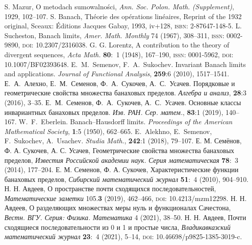 \documentclass[a4paper,14pt]{article}
\begin{document}
	\small
	\begin{thebibliography}{99}
		{}
		S. Mazur, O metodach sumowalno\'sci,
		\emph{Ann. Soc. Polon. Math. (Supplement)}, 1929, 102--107.
		{}
		S. Banach, Th\'eorie des op\'erations lin\'eaires, Reprint of the 1932 original, Sceaux: \'Editions Jacques Gabay,
		1993, iv+128, \textsc{isbn}: 2-87647-148-5.
		{}
		L. Sucheston, Banach limits, \emph{Amer. Math. Monthly} 74 (1967), 308--311, \textsc{issn}: 0002-9890,
		\textsc{doi}: {10.2307/2316038}.
		{}
		G. G. Lorentz, A contribution to the theory of divergent sequences, \emph{Acta Math.} \textbf{80}:~{1}
		(1948), 167--190, \textsc{issn}: 0001-5962, \textsc{doi}: {10.1007/BF02393648}.
		{}
		E.~M.~Semenov, F.~A.~Sukochev. Invariant Banach limits
		and applications. {\it Journal of Functional Analysis}, {\bf 259}:6 (2010), 1517--1541.
		{}
		Е.~А.~Алехно, Е.~М.~Семенов, Ф.~А.~Сукочев, А.~С.~Усачев. Порядковые и геометрические
		свойства множества банаховых пределов. {\it Алгебра и анализ}, {\bf 28}:3 (2016), 3--35.
		{}
		Е.~М.~Семенов, Ф.~А.~Сукочев, А.~С.~Усачев. Основные классы
		инвариантных банаховых пределов. {\it Изв. РАН. Сер. матем.}, {\bf 83}:1 (2019), 140--167.
		{}
		W.~F.~Eberlein. Banach--Hausdorff limits. {\it Proceedings of the
		American Mathematical Society}, {\bf 1}:5 (1950), 662--665.
		{}
		E.~Alekhno, E.~Semenov, F.~Sukochev, A.~Usachev. {\it Studia Math.}, {\bf 242}:1 (2018), 79--107.
		{}
		Е. М. Семёнов, Ф. А. Сукочев, А. С. Усачев, Геометрические свойства множества банаховых пределов,
		\emph{Известия Российской академии наук. Серия математическая} \textbf{78}:~{3} (2014), 177--204.
		{}
		Е. М. Семенов, Ф. А. Сукочев, Характеристические функции банаховых пределов, \emph{Сибирский
			математический журнал} \textbf{51}:~4 (2010), 904--910.
		{}
		Н. Н. Авдеев, О пространстве почти сходящихся последовательностей, \emph{Математические заметки}
		105.\textbf{3} (2019), 462--466, \textsc{doi}: {10.4213/mzm12298}.
		{}
		Н. Н. Авдеев, О разделяющих множествах меры нуль и функционалах Сачестона,
		\emph{Вестн. ВГУ. Серия: Физика. Математика} 4 (2021), 38--50.
		{}
		Н. Н. Авдеев, Почти сходящиеся последовательности из 0 и 1 и
		простые числа, \emph{Владикавказский математический журнал} {\bf 23}:~4 (2021), 5--14,
		\textsc{doi}: {10.46698/p9825-1385-3019-c}.
	\end{thebibliography}
	\normalsize
\end{document}
